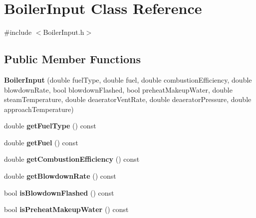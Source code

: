 \hypertarget{class_boiler_input}{}\section{Boiler\+Input Class Reference}
\label{class_boiler_input}


{\ttfamily \#include $<$Boiler\+Input.\+h$>$}

\subsection*{Public Member Functions}
\begin{DoxyCompactItemize}
\item 
\mbox{\label{class_boiler_input_aa0f215112228b7406daa0f7a1adcb64b}} 
{\bfseries Boiler\+Input} (double fuel\+Type, double fuel, double combustion\+Efficiency, double blowdown\+Rate, bool blowdown\+Flashed, bool preheat\+Makeup\+Water, double steam\+Temperature, double deaerator\+Vent\+Rate, double deaerator\+Pressure, double approach\+Temperature)
\item 
\mbox{\label{class_boiler_input_a128aabf791e419378f48600119685bd1}} 
double {\bfseries get\+Fuel\+Type} () const
\item 
\mbox{\label{class_boiler_input_a33ddf0d6523d3acc0f40f36ae0a0e71f}} 
double {\bfseries get\+Fuel} () const
\item 
\mbox{\label{class_boiler_input_a4e84b0ba74ba445ef12c5b53a759ae3d}} 
double {\bfseries get\+Combustion\+Efficiency} () const
\item 
\mbox{\label{class_boiler_input_a5257376f2baa0fb06719c3fd7adb841e}} 
double {\bfseries get\+Blowdown\+Rate} () const
\item 
\mbox{\label{class_boiler_input_a9821b82ca30068ed1f8dc9cc1377c449}} 
bool {\bfseries is\+Blowdown\+Flashed} () const
\item 
\mbox{\label{class_boiler_input_a72cde34ac73269a7018859e601629777}} 
bool {\bfseries is\+Preheat\+Makeup\+Water} () const
\item 
\mbox{\label{class_boiler_input_aec0859643e7edf458fe40685d29a67f8}} 

\end{DoxyCompactItemize}
